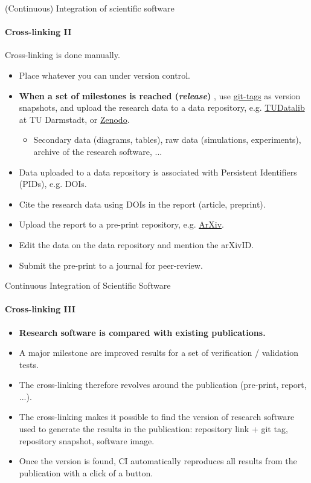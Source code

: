 \begin{frame}{(Continuous) Integration of scientific software} 
\framesubtitle{Cross-linking II}
\vfill

    Cross-linking is done manually. 
    \begin{itemize}
        \item Place whatever you can under version control. 
        \item \textbf{When a set of milestones is reached (\emph{release})} , use \href{https://git-scm.com/book/en/v2/Git-Basics-Tagging}{git-tags} as version snapshots, and upload the research data to a data repository, e.g. \href{https://tudatalib.ulb.tu-darmstadt.de/}{TUDatalib} at TU Darmstadt, or \href{https://zenodo.org/}{Zenodo}.
            \begin{itemize}
                \item Secondary data (diagrams, tables), raw data (simulations, experiments), archive of the research software, ...
            \end{itemize}
        \item Data uploaded to a data repository is associated with Persistent Identifiers (PIDs), e.g. DOIs.
        \item Cite the research data using DOIs in the report (article, preprint).
        \item Upload the report to a pre-print repository, e.g. \href{https://arxiv.org/}{ArXiv}. 
        \item Edit the data on the data repository and mention the arXivID.  
        \item Submit the pre-print to a journal for peer-review.
    \end{itemize}

\end{frame}


\begin{frame}[fragile]{Continuous Integration of Scientific Software}
    \framesubtitle{Cross-linking III} 
    \vfill

    \begin{itemize}
        \item \textbf{Research software is compared with existing publications.}
        \item A major milestone are improved results for a set of verification / validation tests.
        \item The cross-linking therefore revolves around the publication (pre-print, report, ...). 
        \item The cross-linking makes it possible to find the version of research software used to generate the results in the publication: repository link + git tag, repository snapshot, software image. 
        \item Once the version is found, CI automatically reproduces all results from the publication with a click of a button.
    \end{itemize}

\end{frame}


